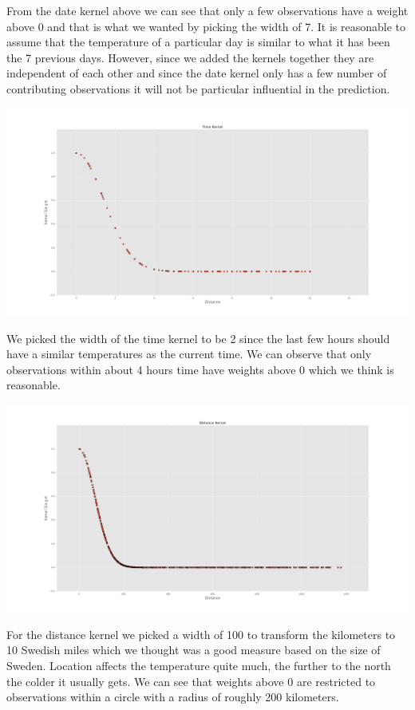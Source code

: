 \documentclass[10pt]{article}
\begin{document}
From the date kernel above we can see that only a few observations have a weight above 0 and that is what we wanted
by picking the width of 7. It is reasonable to assume that the temperature of a particular day 
is similar to what it has been the 7 previous days. However, since we added the kernels together they are independent
of each other and since the date kernel only has a few number of contributing observations it will not be particular influential in the
prediction.

\includegraphics[width=\textwidth]{./images/time_kernel.png}

We picked the width of the time kernel to be 2 since the last few hours should have a similar temperatures as the current time.
We can observe that only observations within about 4 hours time have weights above 0 which we think is reasonable.

\includegraphics[width=\textwidth]{./images/distance_kernel.png}

For the distance kernel we picked a width of 100 to transform the kilometers to 10 Swedish miles which we thought was a
good measure based on the size of Sweden. Location affects the temperature quite much, the further to the north the colder
it usually gets. We can see that weights above 0 are restricted to observations within a circle with a radius of roughly 200 kilometers. 
\end{document}
